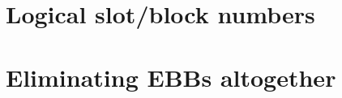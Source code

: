 \section{Logical slot/block numbers}
\label{ebbs:logical}

\section{Eliminating EBBs altogether}
\label{ebbs:elimination}









%


%
%
%


%
%
%
%
%

